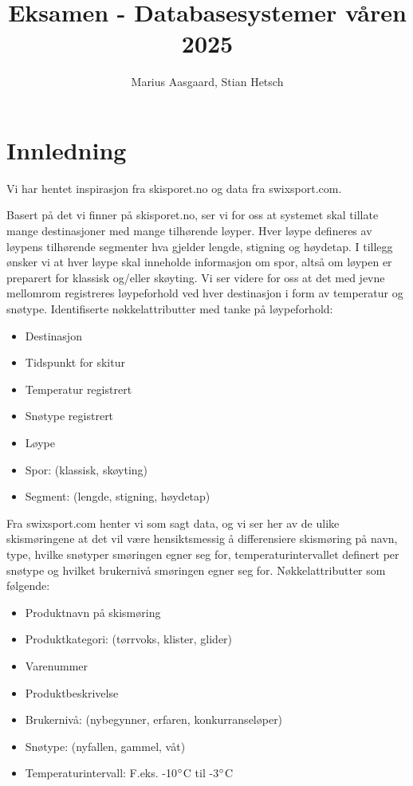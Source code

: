 \documentclass[10pt, a4paper]{article}
\title{Eksamen - Databasesystemer våren 2025}
\author{Marius Aasgaard, Stian Hetsch}
\begin{document}
\maketitle

\section{Innledning}

Vi har hentet inspirasjon fra skisporet.no og data fra swixsport.com.

Basert på det vi finner på skisporet.no, ser vi for oss at systemet skal tillate mange destinasjoner med mange tilhørende løyper. Hver løype defineres av løypens tilhørende segmenter hva gjelder lengde, stigning og høydetap. I tillegg ønsker vi at hver løype skal inneholde informasjon om spor, altså om løypen er preparert for klassisk og/eller skøyting. Vi ser videre for oss at det med jevne mellomrom registreres løypeforhold ved hver destinasjon i form av temperatur og snøtype. Identifiserte nøkkelattributter med tanke på løypeforhold:

\begin{itemize}
	\item Destinasjon
	\item Tidspunkt for skitur 
	\item Temperatur registrert 
	\item Snøtype registrert 
	\item Løype 
	\item Spor: (klassisk, skøyting) 
	\item Segment: (lengde, stigning, høydetap)
\end{itemize}

Fra swixsport.com henter vi som sagt data, og vi ser her av de ulike skismøringene at det vil være hensiktsmessig å differensiere skismøring på navn, type, hvilke snøtyper smøringen egner seg for, temperaturintervallet definert per snøtype og hvilket brukernivå smøringen egner seg for. Nøkkelattributter som følgende:

\begin{itemize}
	\item Produktnavn på skismøring 
	\item Produktkategori: (tørrvoks, klister, glider) 
	\item Varenummer 
	\item Produktbeskrivelse
	\item Brukernivå: (nybegynner, erfaren, konkurranseløper) 
	\item Snøtype: (nyfallen, gammel, våt) 
	\item Temperaturintervall: F.eks. -10$\degree$C til -3$\degree$C 
\end{itemize}
\end{document}
